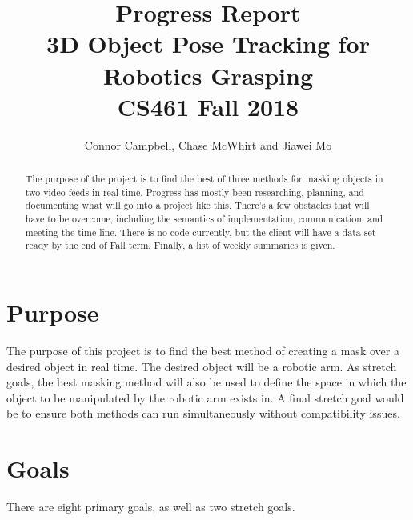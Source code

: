 \documentclass[10pt,journal,compsoc, draftclsnofoot,onecolumn]{IEEEtran}
\begin{document}
\title{
Progress Report\\
3D Object Pose Tracking for Robotics Grasping \\
CS461 Fall 2018
}
\author{Connor Campbell, Chase McWhirt and Jiawei Mo}

\maketitle

\begin{abstract}
The purpose of the project is to find the best of three methods for masking objects in two video feeds in real time.
Progress has mostly been researching, planning, and documenting what will go into a project like this.
There's a few obstacles that will have to be overcome, including the semantics of implementation, communication, and meeting the time line.
There is no code currently, but the client will have a data set ready by the end of Fall term.
Finally, a list of weekly summaries is given.
\end{abstract}

\IEEEdisplaynontitleabstractindextext
\IEEEpeerreviewmaketitle

\newpage
\pagebreak
\tableofcontents
\pagebreak

\section{Purpose}

The purpose of this project is to find the best method of creating a mask over a desired object in real time.
The desired object will be a robotic arm.
As stretch goals, the best masking method will also be used to define the space in which the object to be manipulated by the robotic arm exists in.
A final stretch goal would be to ensure both methods can run simultaneously without compatibility issues.


\section{Goals}

There are eight primary goals, as well as two stretch goals.
\end{document}
